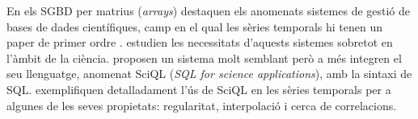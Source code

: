 En els \gls{SGBD} per matrius (\emph{arrays}) destaquen els anomenats
sistemes de gestió de bases de dades científiques, camp en el qual les
sèries temporals hi tenen un paper de primer
ordre \parencite{zhang11,segev87:sigmod}. \textcite{stonebraker09:scidb}
estudien les necessitats d'aquests sistemes sobretot en l'àmbit de la
ciència. \textcite{kersten11} proposen un sistema molt semblant però a
més integren el seu llenguatge, anomenat SciQL (\emph{\gls{SQL} for
  science applications}), amb la sintaxi de
\gls{SQL}. \textcite{zhang11} exemplifiquen detalladament l'ús de
SciQL en les sèries temporals per a algunes de les seves propietats:
regularitat, interpolació i cerca de correlacions.














